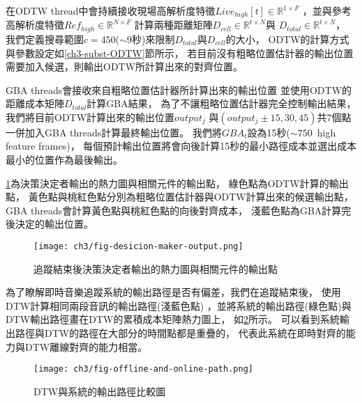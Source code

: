 \documentclass[class=NCU_thesis, crop=false]{standalone}
\begin{document}
在ODTW thread中會持續接收現場高解析度特徵$Live_{high}[t] \in \mathbb{R}^{1 \times F}$
，並與參考高解析度特徵$Ref_{high} \in \mathbb{R}^{N \times F}$
計算兩種距離矩陣$D_{cell} \in \mathbb{R}^{t \times N}$與
$D_{total} \in \mathbb{R}^{t \times N}$，
我們定義搜尋範圍$c=450$($\sim 9$秒)來限制$D_{total}$與$D_{cell}$的大小，
ODTW的計算方式與參數設定如\ref{ch3-subst-ODTW}節所示，
若目前沒有粗略位置估計器的輸出位置需要加入候選，則輸出ODTW所計算出來的對齊位置。

GBA threads會接收來自粗略位置估計器所計算出來的輸出位置
並使用ODTW的距離成本矩陣$D_{total}$計算GBA結果，
為了不讓粗略位置估計器完全控制輸出結果，
我們將目前ODTW計算出來的輸出位置$output_j$
與$(output_j\pm 15, 30, 45)$共7個點一併加入GBA threads計算最終輸出位置。
我們將$GBA_{t}$設為15秒($\sim 750$\ high feature frames)，
每個預計輸出位置將會向後計算15秒的最小路徑成本並選出成本最小的位置作為最後輸出。

\cref{fig:fig-ch3-desicion-maker-output}為決策決定者輸出的熱力圖與相關元件的輸出點，
綠色點為ODTW計算的輸出點，
黃色點與桃紅色點分別為粗略位置估計器與ODTW計算出來的候選輸出點，
GBA threads會計算黃色點與桃紅色點的向後對齊成本，
淺藍色點為GBA計算完後決定的輸出位置。

\begin{figure}[H]
    \centering
    \texttt{[image: ch3/fig-desicion-maker-output.png]}
    \caption{追蹤結束後決策決定者輸出的熱力圖與相關元件的輸出點}
    \label{fig:fig-ch3-desicion-maker-output}
\end{figure}

為了瞭解即時音樂追蹤系統的輸出路徑是否有偏差，我們在追蹤結束後，
使用DTW計算相同兩段音訊的輸出路徑(淺藍色點)
，並將系統的輸出路徑(綠色點)與DTW輸出路徑畫在DTW的累積成本矩陣熱力圖上，
如\cref{fig:fig-ch3-offline-and-online-path}所示。
可以看到系統輸出路徑與DTW的路徑在大部分的時間點都是重疊的，
代表此系統在即時對齊的能力與DTW離線對齊的能力相當。
\begin{figure}[H]
    \centering
    \texttt{[image: ch3/fig-offline-and-online-path.png]}
    \caption{DTW與系統的輸出路徑比較圖}
    \label{fig:fig-ch3-offline-and-online-path}
\end{figure}


\pagebreak
\end{document}

